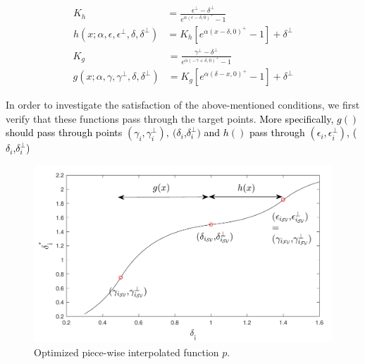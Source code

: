\begin{align}\label{eq:basicfunctions}
K_h &= \frac{\epsilon^{\perp}-\delta^{\perp}}{e^{\alpha(\epsilon-\delta,0)^{+}}-1}\\ \nonumber
h(x;\alpha,\epsilon,\epsilon^{\perp},\delta,\delta^{\perp}) &= K_h[e^{\alpha(x-\delta,0)^{+}}-1] + \delta^{\perp}
\end{align}
\begin{align}
K_g &= \frac{\gamma^{\perp}-\delta^{\perp}}{e^{\alpha(-\gamma+\delta,0)^{+}}-1}\\ \nonumber
g(x;\alpha,\gamma,\gamma^{\perp},\delta,\delta^{\perp}) &= K_g[e^{\alpha(\delta-x,0)^{+}}-1] + \delta^{\perp}
\end{align}



In order to investigate the satisfaction of the above-mentioned conditions, we first verify that these functions pass through the target points. \textcolor{black}{More specifically, $g()$ should pass through points $(\gamma_{i},\gamma^{\perp}_{i}),~(\delta_{i}$,$\delta^{\perp}_{i})$ 
and $h()$ pass through $(\epsilon_{i},\epsilon^{\perp}_{i})$,  ($\delta_{i}$,$\delta^{\perp}_{i}$)} %

\begin{figure}[t]
\centering
\includegraphics[scale=.7]{Fig/optimized_single_v2_croped.pdf}
\caption{Optimized piece-wise interpolated function $p$.} %
\label{fig:optimized_p}
\end{figure}

